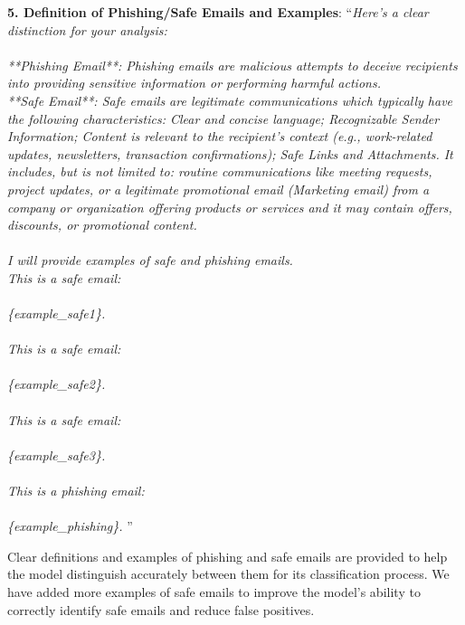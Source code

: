 \noindent \textbf{5. Definition of Phishing/Safe Emails and Examples}: ``\textit{Here's a clear distinction for your analysis: \\ \\**Phishing Email**: Phishing emails are malicious attempts to deceive recipients into providing sensitive information or performing harmful actions.
            \\
            **Safe Email**: Safe emails are legitimate communications which typically have the following characteristics: Clear and concise language; Recognizable Sender Information; Content is relevant to the recipient's context (e.g., work-related updates, newsletters, transaction confirmations); Safe Links and Attachments. It includes, but is not limited to: routine communications like meeting requests, project updates, or a legitimate promotional email (Marketing email) from a company or organization offering products or services and it may contain offers, discounts, or promotional content.
            \\ \\
            I will provide examples of safe and phishing emails.\\
             This is a safe email:\\ \\
            \{example\_safe1\}.\\ \\
             This is a safe email:\\ \\ 
            \{example\_safe2\}.\\ \\ 
             This is a safe email:\\ \\
            \{example\_safe3\}.\\ \\
             This is a phishing email:\\ \\
            \{example\_phishing\}.
            }''
            
\indent Clear definitions and examples of phishing and safe emails are provided to help the model distinguish accurately between them for its classification process. We have added more examples of safe emails to improve the model’s ability to correctly identify safe emails and reduce false positives. \\
            
